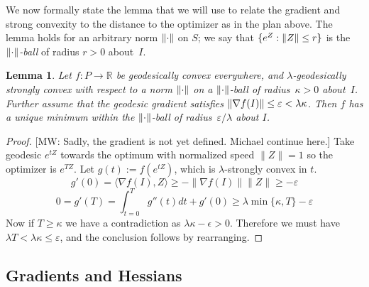 \documentclass{article}
\newtheorem{lemma}[theorem]{Lemma}
\DeclarePairedDelimiter{\norm}{\lVert}{\rVert}
\newcommand{\R}{{\mathbb{R}}}
\newcommand\eps{\varepsilon}
\newcommand{\MW}[1]{{\color{red}[MW: #1]}}
\begin{document}
We now formally state the lemma that we will use to relate the gradient and strong convexity to the distance to the optimizer as in the plan above.
The lemma holds for an arbitrary norm $\norm{\cdot}$ on $S$; we say that $\{ e^Z : \norm Z \leq r \}$ is the \emph{$\norm{\cdot}$-ball} of radius $r>0$ about~$I$.

\begin{lemma}\label{lem:convex-ball}
Let $f\colon P\to \R$ be geodesically convex everywhere, and $\lambda$-geodesically strongly convex with respect to a norm $\norm{\cdot}$ on a $\norm{\cdot}$-ball of radius~$\kappa>0$ about~$I$.
Further assume that the geodesic gradient satisfies $\norm{\nabla f(I)} \leq \eps < \lambda \kappa$.
Then $f$ has a unique minimum within the $\norm{\cdot}$-ball of radius~$\eps/\lambda$ about $I$.
\end{lemma}
\begin{proof}
\MW{Sadly, the gradient is not yet defined. Michael continue here.}
Take geodesic $e^{t Z}$ towards the optimum with normalized speed $\|Z\| = 1$ so the optimizer is $e^{T Z}$. Let $g(t) := f(e^{tZ})$, which is $\lambda$-strongly convex in $t$.
\[ g'(0) = \langle \nabla f(I), Z \rangle \geq - \|\nabla f(I)\| \|Z\| \geq - \eps   \]
\[ 0 = g'(T) = \int_{t=0}^{T} g''(t) dt + g'(0) \geq \lambda \min\{\kappa,T\} - \eps     \]
Now if $T \geq \kappa$ we have a contradiction as $\lambda \kappa - \epsilon > 0$. Therefore we must have $\lambda T < \lambda \kappa \leq \eps$, and the conclusion follows by rearranging.
\end{proof}











\subsection{Gradients and Hessians}
\end{document}
